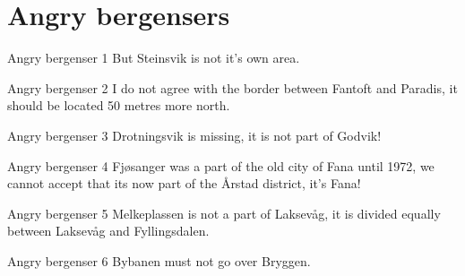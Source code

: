 \section{Angry bergensers}
\begin{frame}
    \begin{block}{Angry bergenser 1}
        But Steinsvik is not it's own area.
    \end{block}
    \pause
    \begin{block}{Angry bergenser 2}
        I do not agree with the border between Fantoft and Paradis, it should be located 50 metres more north.
    \end{block}
    \pause
    \begin{block}{Angry bergenser 3}
        Drotningsvik is missing, it is not part of Godvik!
    \end{block}
\end{frame}

\begin{frame}
    \begin{block}{Angry bergenser 4}
        Fjøsanger was a part of the old city of Fana until 1972, we cannot accept that its now part of the Årstad district, it's Fana!
    \end{block}
    \pause
    \begin{block}{Angry bergenser 5}
        Melkeplassen is not a part of Laksevåg, it is divided equally between Laksevåg and Fyllingsdalen.
    \end{block}
    \pause
    \begin{block}{Angry bergenser 6}
        Bybanen must not go over Bryggen.
    \end{block}
\end{frame}